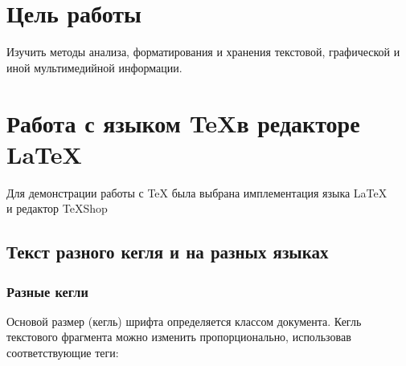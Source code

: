 \documentclass[a4paper]{article}
\begin{document}
\section{Цель работы}
Изучить методы анализа, форматирования и хранения текстовой, графической и иной мультимедийной информации.
\section{Работа с языком \TeX в редакторе \LaTeX}
Для демонстрации работы с \TeX \hspace{0.1cm} была выбрана имплементация языка \LaTeX \hspace{0.1cm} \\и редактор \TeX Shop
\subsection{Текст разного кегля и на разных языках}
\subsubsection{Разные кегли}
Основой размер (кегль) шрифта определяется классом документа. 
Кегль текстового фрагмента можно изменить пропорционально, использовав соответствующие теги:
\end{document}
